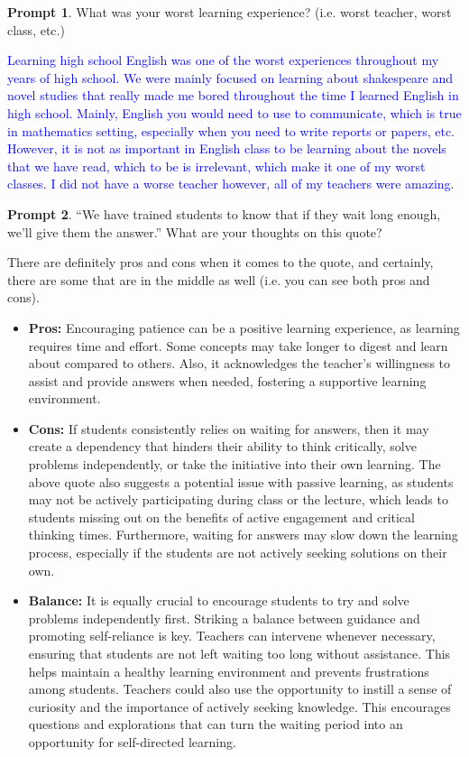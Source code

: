 \documentclass[11pt]{article}
\theoremstyle{theorem}\newtheorem*{task}{Task}
\theoremstyle{theorem}\newtheorem*{example}{Example}
\theoremstyle{definition}\newtheorem*{solution}{Solution}
\theoremstyle{theorem}\newtheorem*{prompt}{Prompt}
\begin{document}
\begin{prompt}
    What was your worst learning experience? (i.e. worst teacher, worst class, etc.)
\end{prompt}

\textcolor{Blue}{Learning high school English was one of the worst experiences throughout my years of high school. We were mainly focused on learning about shakespeare and novel studies that really made me bored throughout the time I learned English in high school. Mainly, English you would need to use to communicate, which is true in mathematics setting, especially when you need to write reports or papers, etc. However, it is not as important in English class to be learning about the novels that we have read, which to be is irrelevant, which make it one of my worst classes. I did not have a worse teacher however, all of my teachers were amazing.}

\begin{prompt}
    ``We have trained students to know that if they wait long enough, we'll give them the answer.'' What are your thoughts on this quote?
\end{prompt}

\color{Blue}

There are definitely pros and cons when it comes to the quote, and certainly, there are some that are in the middle as well (i.e. you can see both pros and cons).
\begin{itemize}
    \item \textbf{Pros:} Encouraging patience can be a positive learning experience, as learning requires time and effort. Some concepts may take longer to digest and learn about compared to others. Also, it acknowledges the teacher's willingness to assist and provide answers when needed, fostering a supportive learning environment.
    \item \textbf{Cons:} If students consistently relies on waiting for answers, then it may create a dependency that hinders their ability to think critically, solve problems independently, or take the initiative into their own learning. The above quote also suggests a potential issue with passive learning, as students may not be actively participating during class or the lecture, which leads to students missing out on the benefits of active engagement and critical thinking times. Furthermore, waiting for answers may slow down the learning process, especially if the students are not actively seeking solutions on their own.
    \item \textbf{Balance:} It is equally crucial to encourage students to try and solve problems independently first. Striking a balance between guidance and promoting self-reliance is key. Teachers can intervene whenever necessary, ensuring that students are not left waiting too long without assistance. This helps maintain a healthy learning environment and prevents frustrations among students. Teachers could also use the opportunity to instill a sense of curiosity and the importance of actively seeking knowledge. This encourages questions and explorations that can turn the waiting period into an opportunity for self-directed learning.
\end{itemize}
\end{document}
